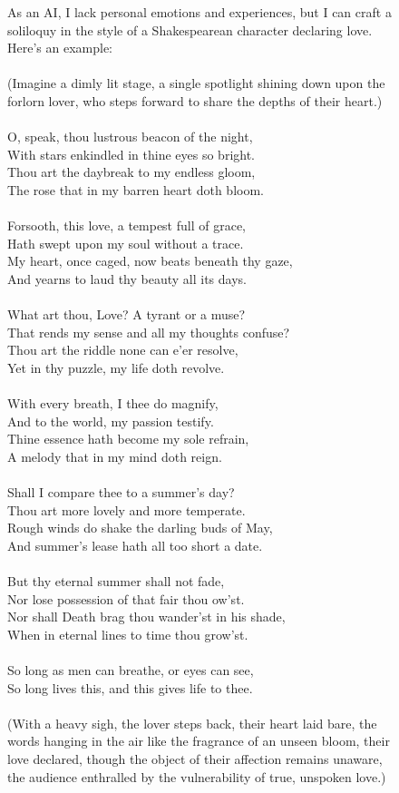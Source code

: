 \documentclass{article}
\begin{document}
\begin{figure}[htbp]
As an AI, I lack personal emotions and experiences, but I can craft a soliloquy in the style of a Shakespearean character declaring love. Here's an example:\\
\\
(Imagine a dimly lit stage, a single spotlight shining down upon the forlorn lover, who steps forward to share the depths of their heart.)\\
\\
O, speak, thou lustrous beacon of the night,\\
With stars enkindled in thine eyes so bright.\\
Thou art the daybreak to my endless gloom,\\
The rose that in my barren heart doth bloom.\\
\\
Forsooth, this love, a tempest full of grace,\\
Hath swept upon my soul without a trace.\\
My heart, once caged, now beats beneath thy gaze,\\
And yearns to laud thy beauty all its days.\\
\\
What art thou, Love? A tyrant or a muse?\\
That rends my sense and all my thoughts confuse?\\
Thou art the riddle none can e'er resolve,\\
Yet in thy puzzle, my life doth revolve.\\
\\
With every breath, I thee do magnify,\\
And to the world, my passion testify.\\
Thine essence hath become my sole refrain,\\
A melody that in my mind doth reign.\\
\\
Shall I compare thee to a summer's day?\\
Thou art more lovely and more temperate.\\
Rough winds do shake the darling buds of May,\\
And summer's lease hath all too short a date.\\
\\
But thy eternal summer shall not fade,\\
Nor lose possession of that fair thou ow'st.\\
Nor shall Death brag thou wander'st in his shade,\\
When in eternal lines to time thou grow'st.\\
\\
So long as men can breathe, or eyes can see,\\
So long lives this, and this gives life to thee.\\
\\
(With a heavy sigh, the lover steps back, their heart laid bare, the words hanging in the air like the fragrance of an unseen bloom, their love declared, though the object of their affection remains unaware, the audience enthralled by the vulnerability of true, unspoken love.)


\end{figure}
\end{document}
